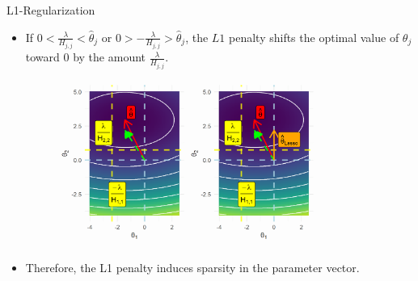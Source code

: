 \begin{vbframe} {L1-Regularization}
\begin{itemize}
  \end{itemize}
\framebreak
  \begin{itemize}
  
    \item If $0 < \frac{\lambda}{H_{j,j}} < \hat{\theta}_j$ or  $0 > -\frac{\lambda}{H_{j,j}} > \hat{\theta}_j$, the $L1$ penalty shifts the optimal value of $\theta_j$ toward 0 by the amount $\frac{\lambda}{H_{j,j}}$.

\vfill


\begin{figure}
\includegraphics[width=0.8\textwidth]{figure/l1_reg_hess_02.png}\\
\end{figure}

    \item Therefore, the L1 penalty induces sparsity in the parameter vector.
  \end{itemize}

  
\end{vbframe}

\endlecture

